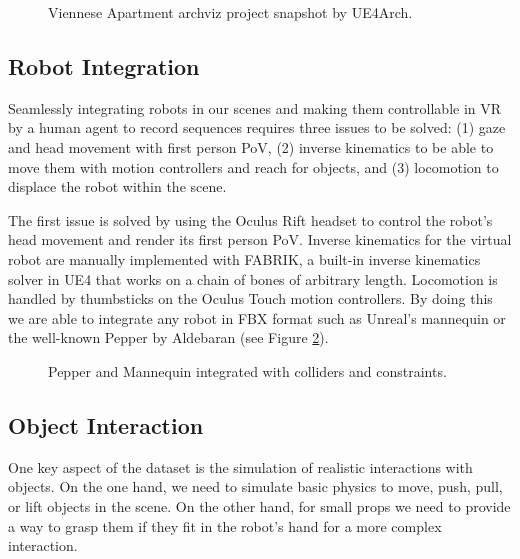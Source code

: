 \begin{figure}[!th]
  \centering
  \caption{Viennese Apartment archviz project snapshot by UE4Arch.}
  \label{fig:ue4arch}
\end{figure}

\subsection{Robot Integration}

Seamlessly integrating robots in our scenes and making them controllable in \ac{VR} by a human agent to record sequences requires three issues to be solved: (1) gaze and head movement with first person \ac{PoV}, (2) inverse kinematics to be able to move them with motion controllers and reach for objects, and (3) locomotion to displace the robot within the scene.

The first issue is solved by using the Oculus Rift headset to control the robot's head movement and render its first person \ac{PoV}. Inverse kinematics for the virtual robot are manually implemented with \ac{FABRIK}, a built-in inverse kinematics solver in \ac{UE4} that works on a chain of bones of arbitrary length. Locomotion is handled by thumbsticks on the Oculus Touch  motion controllers. By doing this we are able to integrate any robot in FBX format such as Unreal's mannequin or the well-known Pepper by Aldebaran (see Figure \ref{fig:robot_integration}).

\begin{figure}[!htb]
  \centering
  \caption{Pepper and Mannequin integrated with colliders and constraints.}
  \label{fig:robot_integration}
\end{figure}

\clearpage

\subsection{Object Interaction}

One key aspect of the dataset is the simulation of realistic interactions with objects. On the one hand, we need to simulate basic physics to move, push, pull, or lift objects in the scene. On the other hand, for small props we need to provide a way to grasp them if they fit in the robot's hand for a more complex interaction.

